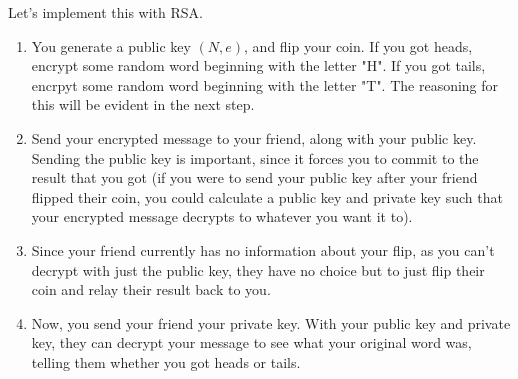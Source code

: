 \begin{solution}
Let's implement this with RSA.
\begin{enumerate}
	\item You generate a public key $(N, e)$, and flip your coin. If you got heads, encrypt some random word beginning with the letter "H". If you got tails, encrpyt some random word beginning with the letter "T". The reasoning for this will be evident in the next step.
	\item Send your encrypted message to your friend, along with your public key. Sending the public key is important, since it forces you to commit to the result that you got (if you were to send your public key after your friend flipped their coin, you could calculate a public key and private key such that your encrypted message decrypts to whatever you want it to).
	\item Since your friend currently has no information about your flip, as you can't decrypt with just the public key, they have no choice but to just flip their coin and relay their result back to you.
	\item Now, you send your friend your private key. With your public key and private key, they can decrypt your message to see what your original word was, telling them whether you got heads or tails.
\end{enumerate}
\end{solution}

\clearpage